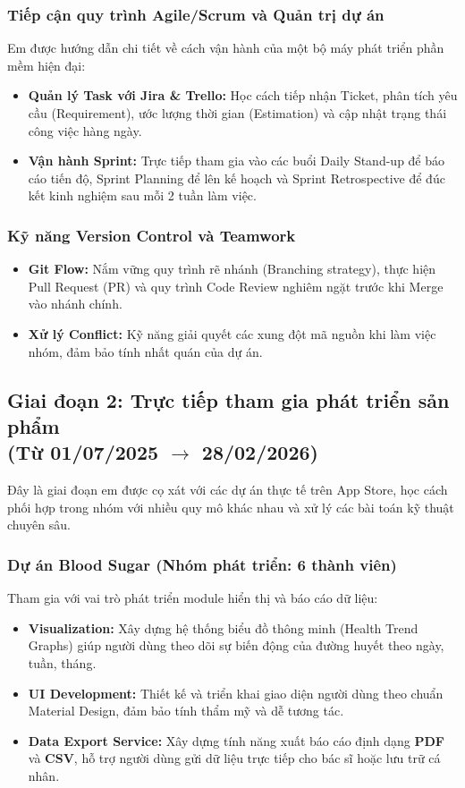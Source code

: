 \documentclass[12pt, a4paper]{article}
\begin{document}
\subsubsection{Tiếp cận quy trình Agile/Scrum và Quản trị dự án}
Em được hướng dẫn chi tiết về cách vận hành của một bộ máy phát triển phần mềm hiện đại:
\begin{itemize}
    \item \textbf{Quản lý Task với Jira \& Trello:} Học cách tiếp nhận Ticket, phân tích yêu cầu (Requirement), ước lượng thời gian (Estimation) và cập nhật trạng thái công việc hàng ngày.
    \item \textbf{Vận hành Sprint:} Trực tiếp tham gia vào các buổi Daily Stand-up để báo cáo tiến độ, Sprint Planning để lên kế hoạch và Sprint Retrospective để đúc kết kinh nghiệm sau mỗi 2 tuần làm việc.
\end{itemize}

\subsubsection{Kỹ năng Version Control và Teamwork}
\begin{itemize}
    \item \textbf{Git Flow:} Nắm vững quy trình rẽ nhánh (Branching strategy), thực hiện Pull Request (PR) và quy trình Code Review nghiêm ngặt trước khi Merge vào nhánh chính.
    \item \textbf{Xử lý Conflict:} Kỹ năng giải quyết các xung đột mã nguồn khi làm việc nhóm, đảm bảo tính nhất quán của dự án.
\end{itemize}

\subsection[Giai đoạn 2: Trực tiếp tham gia phát triển sản phẩm (Từ 01/07/2025 đến 28/02/2026)]{Giai đoạn 2: Trực tiếp tham gia phát triển sản phẩm \\(Từ 01/07/2025 $\rightarrow$ 28/02/2026)}
Đây là giai đoạn em được cọ xát với các dự án thực tế trên App Store, học cách phối hợp trong nhóm với nhiều quy mô khác nhau và xử lý các bài toán kỹ thuật chuyên sâu.

\subsubsection{Dự án Blood Sugar (Nhóm phát triển: 6 thành viên)}
Tham gia với vai trò phát triển module hiển thị và báo cáo dữ liệu:
\begin{itemize}
    \item \textbf{Visualization:} Xây dựng hệ thống biểu đồ thông minh (Health Trend Graphs) giúp người dùng theo dõi sự biến động của đường huyết theo ngày, tuần, tháng.
    \item \textbf{UI Development:} Thiết kế và triển khai giao diện người dùng theo chuẩn Material Design, đảm bảo tính thẩm mỹ và dễ tương tác.
    \item \textbf{Data Export Service:} Xây dựng tính năng xuất báo cáo định dạng \textbf{PDF} và \textbf{CSV}, hỗ trợ người dùng gửi dữ liệu trực tiếp cho bác sĩ hoặc lưu trữ cá nhân.
\end{itemize}
\end{document}
